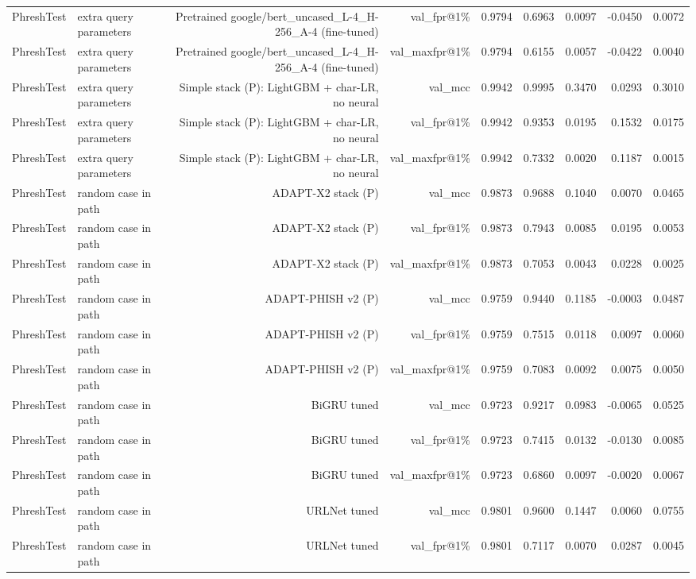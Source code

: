 \begin{table}[t]
\begin{tabular}{llrrrrrrr}
PhreshTest & extra query parameters & Pretrained google/bert\_uncased\_L-4\_H-256\_A-4 (fine-tuned) & val\_fpr@1\% & 0.9794 & 0.6963 & 0.0097 & -0.0450 & 0.0072 \\
PhreshTest & extra query parameters & Pretrained google/bert\_uncased\_L-4\_H-256\_A-4 (fine-tuned) & val\_maxfpr@1\% & 0.9794 & 0.6155 & 0.0057 & -0.0422 & 0.0040 \\
PhreshTest & extra query parameters & Simple stack (P): LightGBM + char-LR, no neural & val\_mcc & 0.9942 & 0.9995 & 0.3470 & 0.0293 & 0.3010 \\
PhreshTest & extra query parameters & Simple stack (P): LightGBM + char-LR, no neural & val\_fpr@1\% & 0.9942 & 0.9353 & 0.0195 & 0.1532 & 0.0175 \\
PhreshTest & extra query parameters & Simple stack (P): LightGBM + char-LR, no neural & val\_maxfpr@1\% & 0.9942 & 0.7332 & 0.0020 & 0.1187 & 0.0015 \\
PhreshTest & random case in path & ADAPT-X2 stack (P) & val\_mcc & 0.9873 & 0.9688 & 0.1040 & 0.0070 & 0.0465 \\
PhreshTest & random case in path & ADAPT-X2 stack (P) & val\_fpr@1\% & 0.9873 & 0.7943 & 0.0085 & 0.0195 & 0.0053 \\
PhreshTest & random case in path & ADAPT-X2 stack (P) & val\_maxfpr@1\% & 0.9873 & 0.7053 & 0.0043 & 0.0228 & 0.0025 \\
PhreshTest & random case in path & ADAPT-PHISH v2 (P) & val\_mcc & 0.9759 & 0.9440 & 0.1185 & -0.0003 & 0.0487 \\
PhreshTest & random case in path & ADAPT-PHISH v2 (P) & val\_fpr@1\% & 0.9759 & 0.7515 & 0.0118 & 0.0097 & 0.0060 \\
PhreshTest & random case in path & ADAPT-PHISH v2 (P) & val\_maxfpr@1\% & 0.9759 & 0.7083 & 0.0092 & 0.0075 & 0.0050 \\
PhreshTest & random case in path & BiGRU tuned & val\_mcc & 0.9723 & 0.9217 & 0.0983 & -0.0065 & 0.0525 \\
PhreshTest & random case in path & BiGRU tuned & val\_fpr@1\% & 0.9723 & 0.7415 & 0.0132 & -0.0130 & 0.0085 \\
PhreshTest & random case in path & BiGRU tuned & val\_maxfpr@1\% & 0.9723 & 0.6860 & 0.0097 & -0.0020 & 0.0067 \\
PhreshTest & random case in path & URLNet tuned & val\_mcc & 0.9801 & 0.9600 & 0.1447 & 0.0060 & 0.0755 \\
PhreshTest & random case in path & URLNet tuned & val\_fpr@1\% & 0.9801 & 0.7117 & 0.0070 & 0.0287 & 0.0045 \\

\end{tabular}
\end{table}
